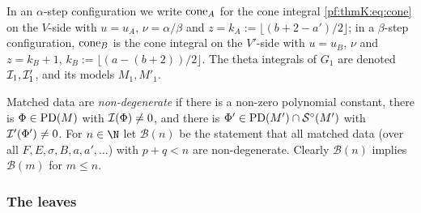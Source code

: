In an $\alpha$-step configuration we write $\operatorname{cone}_A$ for the cone integral \eqref{pf:thmK:eq:cone} on the $V$-side with
$u=u_A$, $\nu=\alpha/\beta$ and $z=k_A:=\lfloor(b+2-a')/2\rfloor$; in a $\beta$-step configuration, $\operatorname{cone}_B$ is the cone
integral on the $V'$-side with $u=u_B$, $\nu$ and $z=k_B+1$, $k_B:=\lfloor(a-(b+2))/2\rfloor$. The theta integrals of $G_1$
are denoted $\mathcal{I}_1,\mathcal{I}'_1$, and its models $M_1,M'_1$.

\begin{definition}\label{pf:thmK:def:claim}
Matched data are \emph{non-degenerate} if there is a non-zero polynomial constant, there is $\Phi\in\operatorname{PD}(M)$ with
$\mathcal{I}(\Phi)\ne0$, and there is $\Phi'\in\operatorname{PD}(M')\cap\mathcal{S}^{\circ}(M')$ with $\mathcal{I}'(\Phi')\ne0$. For $n\in\N$ let
$\mathcal B(n)$ be the statement that all matched data (over all $F,E,\sigma,B,a,a',\dots$) with $p+q<n$ are
non-degenerate. Clearly $\mathcal B(n)$ implies $\mathcal B(m)$ for $m\le n$.
\end{definition}

\subsubsection{The leaves}\label{sec:pf:thmK:leavesdef}

